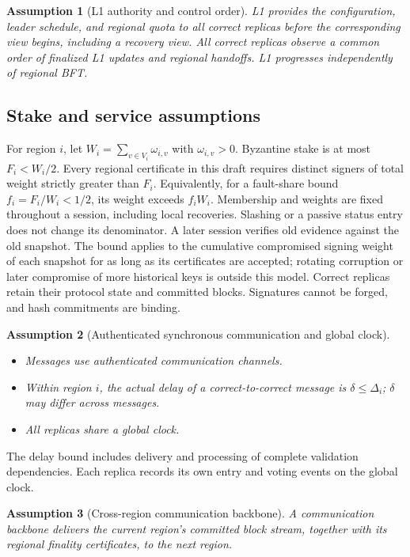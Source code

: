 \documentclass[11pt,a4paper]{article}
\newtheorem{assumption}[assumption]{Assumption}
\newcounter{protocol}
\begin{document}
\begin{assumption}[L1 authority and control order]
\label{ass:authority}
L1 provides the configuration, leader schedule, and regional quota to
all correct replicas before the corresponding view begins, including
a recovery view. All correct replicas observe a common order of
finalized L1 updates and regional handoffs. L1 progresses independently
of regional BFT.
\end{assumption}

\subsection{Stake and service assumptions}
For region $i$, let $W_i=\sum_{v\in V_i}\omega_{i,v}$ with
$\omega_{i,v}>0$. Byzantine stake is at most $F_i<W_i/2$.
Every regional certificate in this draft requires distinct signers of
total weight strictly greater than $F_i$. Equivalently, for a fault-share
bound $f_i=F_i/W_i<1/2$, its weight exceeds $f_iW_i$.
Membership and weights are fixed throughout a session, including local
recoveries. Slashing or a passive status entry does not change its
denominator. A later session verifies old evidence against the old snapshot.
The bound applies to the cumulative compromised signing weight of each
snapshot for as long as its certificates are accepted; rotating corruption
or later compromise of more historical keys is outside this model.
Correct replicas retain their protocol state and committed blocks.
Signatures cannot be forged, and hash commitments are binding.

\begin{assumption}[Authenticated synchronous communication and global clock]
\label{ass:network}
\leavevmode\par
\begin{itemize}
    \item Messages use authenticated communication channels.
    \item Within region $i$, the actual delay of a correct-to-correct
    message is $\delta\le\Delta_i$; $\delta$ may differ across messages.
    \item All replicas share a global clock.
\end{itemize}
\end{assumption}
The delay bound includes delivery and processing of complete validation
dependencies. Each replica records its own entry and voting events on
the global clock.

\begin{assumption}[Cross-region communication backbone]
\label{ass:infra}
A communication backbone delivers the current region's committed block
stream, together with its regional finality certificates, to the next region.
\end{assumption}
\end{document}
